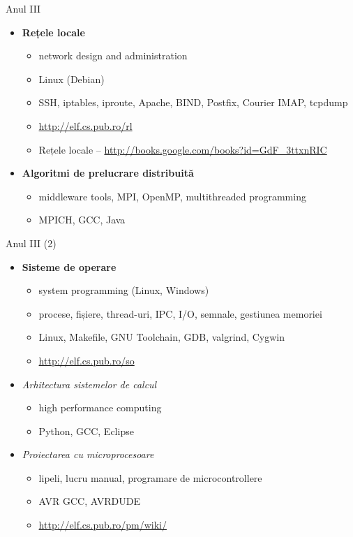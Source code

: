 \documentclass{beamer}
\begin{document}
\begin{frame}{Anul III}
	\begin{itemize}
		\item \textbf{Rețele locale}
			\begin{itemize}
				\item network design and administration
				\item Linux (Debian)
				\item SSH, iptables, iproute, Apache, BIND, Postfix, Courier
				IMAP, tcpdump
				\item \url{http://elf.cs.pub.ro/rl}
				\item Rețele locale --
				\url{http://books.google.com/books?id=GdF_3ttxnRIC}
			\end{itemize}
		\item \textbf{Algoritmi de prelucrare distribuită}
			\begin{itemize}
				\item middleware tools, MPI, OpenMP, multithreaded programming
				\item MPICH, GCC, Java
			\end{itemize}
	\end{itemize}
\end{frame}

\begin{frame}{Anul III (2)}
	\begin{itemize}
		\item \textbf{Sisteme de operare}
			\begin{itemize}
				\item system programming (Linux, Windows)
				\item procese, fișiere, thread-uri, IPC, I/O, semnale,
				gestiunea memoriei
				\item Linux, Makefile, GNU Toolchain, GDB, valgrind, Cygwin
				\item \url{http://elf.cs.pub.ro/so}
			\end{itemize}
		\item \textit{Arhitectura sistemelor de calcul}
			\begin{itemize}
				\item high performance computing
				\item Python, GCC, Eclipse
			\end{itemize}
		\item \textit{Proiectarea cu microprocesoare}
			\begin{itemize}
				\item lipeli, lucru manual, programare de microcontrollere
				\item AVR GCC, AVRDUDE
				\item \url{http://elf.cs.pub.ro/pm/wiki/}
			\end{itemize}
	\end{itemize}
\end{frame}
\end{document}
